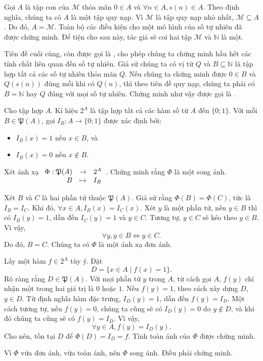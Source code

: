 Gọi $A$ là tập con của $\mathcal{M}$ thỏa mãn $0 \in A$ và $\forall n \in A, s(n) \in A$. Theo định nghĩa, chúng ta có $A$ là một tập quy nạp. Vì $\mathcal{M}$ là tập quy nạp nhỏ nhất, $\mathcal{M} \subseteq A$. Do đó, $A = \mathcal{M}$. Toàn bộ các điều kiện cho một mô hình của số tự nhiên đã được chứng minh. Để tiện cho sau này, tác giả sẽ coi hai tập $\mathcal{M}$ và $\mathbb{N}$ là một.

Tiên đề cuối cùng, còn được gọi là , cho phép chúng ta chứng minh hầu hết các tính chất liên quan đến số tự nhiên. Giả sử chúng ta có vị từ $Q$ và $B \subseteq \mathbb{N}$ là tập hợp tất cả các số tự nhiên thỏa mãn $Q$. Nếu chúng ta chứng minh được $0 \in B$ và $Q(s(n))$ đúng mỗi khi có $Q(n)$, thì theo tiên đề quy nạp, chúng ta phải có $B = \mathbb{N}$ hay $Q$ đúng với mọi số tự nhiên. Chứng minh như vậy được gọi là . 

\exercise Cho tập hợp $A$. Kí hiệu $2^A$ là tập hợp tất cả các hàm số từ $A$ đến $\{0; 1\}$. Với mỗi $B \in \mathfrak{P}(A)$, gọi  $I_B: A \to \{0; 1\}$ được xác định bởi:
\begin{itemize}
   \item $I_B(x) = 1$ nếu $x \in B$, và 
   \item  $I_B(x) = 0$ nếu $x \notin B$.
\end{itemize}
Xét ánh xạ $\begin{array}[t]{rcl}
   \Phi : \mathfrak{P}(A) & \to & 2^A \\
      B & \mapsto & I_B
\end{array}$. Chứng minh rằng $\Phi$ là một song ánh.

\solution

Xét $B$ và $C$ là hai phần tử thuộc $\mathfrak{P}(A)$. Giả sử rằng $\Phi(B) = \Phi(C)$, tức là $I_B = I_C$. Khi đó, $\forall x \in A, I_B(x) = I_C(x)$. Xét $y$ là một phần tử, nếu $y \in B$ thì có $I_B(y) = 1$, dẫn đến $I_C(y) = 1$ và $y \in C$. Tương tự, $y \in C$ sẽ kéo theo $y \in B$. Vì vậy, \begin{equation*}
   \forall y, y \in B \iff y \in C.
\end{equation*}
Do đó, $B = C$. Chúng ta có $\Phi$ là một ánh xạ đơn ánh.

Lấy một hàm $f \in 2^A$ tùy ý. Đặt \begin{equation*}
   D = \{x \in A \mid f(x) = 1\}.
\end{equation*}
Rõ ràng rằng $D \in \mathfrak{P}(A)$. Với mọi phần tử $y$ trong $A$, từ cách gọi $A$, $f(y)$ chỉ nhận một trong hai giá trị là $0$ hoặc $1$. Nếu $f(y) = 1$, theo cách xây dựng $D$, $y \in D$. Từ định nghĩa hàm đặc trưng, $I_D(y) = 1$, dẫn đến $f(y) = I_D$. Một cách tương tự, nếu $f(y) = 0$, chúng ta cũng sẽ có $I_D(y) = 0$ do $y \notin D$, và khi đó chúng ta cũng sẽ có $f(y) = I_D$. Vì vậy, 
\begin{equation*}
   \forall y \in A, f(y) = I_D(y).
\end{equation*}
Cho nên, tồn tại $D$ để $\Phi(D) = I_D = f$. Tính toàn ánh của $\Phi$ được chứng minh.

Vì $\Phi$ vừa đơn ánh, vừa toàn ánh, nên $\Phi$ song ánh. Điều phải chứng minh.